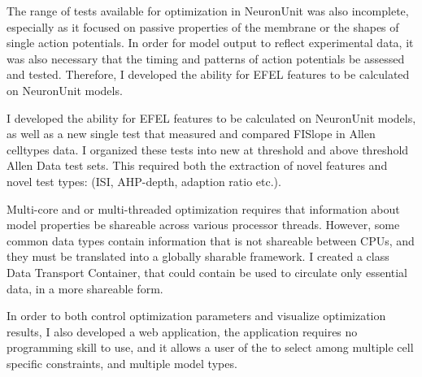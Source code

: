The range of tests available for optimization in NeuronUnit was also incomplete, especially as it focused on passive properties of the membrane or the shapes of single action potentials.  In order for model output to reflect experimental data, it was also necessary that the timing and patterns of action potentials be assessed and tested.  Therefore, I developed the ability for EFEL features to be calculated on NeuronUnit models. 


I developed the ability for EFEL features to be calculated on NeuronUnit models, as well as a new single test that measured and compared FISlope in Allen celltypes data. I organized these tests into new at threshold and above threshold Allen Data test sets. This required both the extraction of novel features and novel test types: (ISI, AHP-depth, adaption ratio etc.).   


Multi-core and or multi-threaded optimization requires that information about model properties be shareable across various processor threads. However, some common data types contain information that is not shareable between CPUs, and they must be translated into a globally sharable framework. I created a class Data Transport Container, that could contain be used to circulate only essential data, in a more shareable form. 

In order to both control optimization parameters and visualize optimization results, I also developed a web application, the application requires no programming skill to use, and it allows a user of the to select among multiple cell specific constraints, and multiple model types. %
